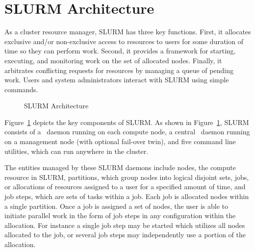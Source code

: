 \section{SLURM Architecture}

As a cluster resource manager, SLURM has three key functions.  First,
it allocates exclusive and/or non-exclusive access to resources to users for
some duration of time so they can perform work.  Second, it provides
a framework for starting, executing, and monitoring work
on the set of allocated nodes.  Finally, it arbitrates
conflicting requests for resources by managing a queue of pending work.
Users and system administrators interact with SLURM using simple commands.

%
%

\begin{figure}[tb]
\centerline{}
\caption{SLURM Architecture}
\label{arch}
\end{figure}

Figure~\ref{arch} depicts the key components of SLURM. As shown in Figure~\ref{arch},
SLURM consists of a \slurmd\ daemon
running on each compute node, a central \slurmctld\ daemon running on
a management node (with optional fail-over twin), and five command line
utilities,
which can run anywhere in the cluster.

The entities managed by these SLURM daemons include nodes, the
compute resource in SLURM, partitions, which group nodes into
logical disjoint sets, jobs, or allocations of resources assigned
to a user for a specified amount of time, and job steps, which are
sets of tasks within a job.
Each job is allocated nodes within a single partition.
Once a job is assigned a set of nodes, the user is able to initiate
parallel work in the form of job steps in any configuration within the
allocation. For instance a single job step may be started which utilizes
all nodes allocated to the job, or several job steps may independently
use a portion of the allocation.

